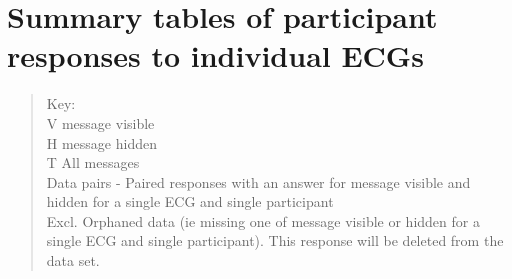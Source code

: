 
\chapter{Summary tables of participant responses to individual ECGs}
\label{appendixh}

\begin{quote}
Key:\\
V message visible\\
H message hidden\\
T All messages\\
Data pairs - Paired responses with an answer for message visible and hidden for a single ECG and single participant\\
Excl. Orphaned data (ie missing one of message visible or hidden for a single ECG and single participant). This response will be deleted from the data set. 
\end{quote}

 

